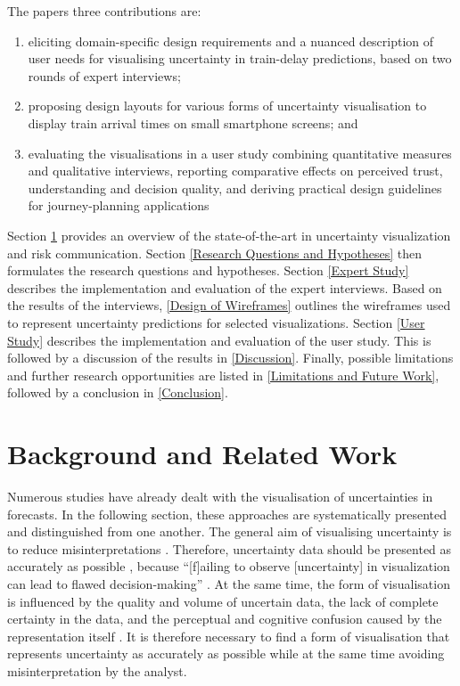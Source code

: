 \documentclass[final,journal,a4paper]{IEEEtran}
\begin{document}
\newline
\newline
The papers three contributions are: 
\begin{enumerate}
    \item eliciting domain-specific design requirements and a nuanced description of user needs for visualising uncertainty in train-delay predictions, based on two rounds of expert interviews;
    \item proposing design layouts for various forms of uncertainty visualisation to display train arrival times on small smartphone screens; and
    \item evaluating the visualisations in a user study combining quantitative measures and qualitative interviews, reporting comparative effects on perceived trust, understanding and decision quality, and deriving practical design guidelines for journey-planning applications
\end{enumerate}
Section \ref{Background and Related Work} provides an overview of the state-of-the-art in uncertainty visualization and risk communication. Section \ref{Research Questions and Hypotheses} then formulates the research questions and hypotheses. Section \ref{Expert Study} describes the implementation and evaluation of the expert interviews. Based on the results of the interviews, \ref{Design of Wireframes} outlines the wireframes used to represent uncertainty predictions for selected visualizations. Section \ref{User Study} describes the implementation and evaluation of the user study. This is followed by a discussion of the results in \ref{Discussion}. Finally, possible limitations and further research opportunities are listed in \ref{Limitations and Future Work}, followed by a conclusion in \ref{Conclusion}.

\section{Background and Related Work} \label{Background and Related Work}
Numerous studies have already dealt with the visualisation of uncertainties in forecasts. In the following section, these approaches are systematically presented and distinguished from one another. The general aim of visualising uncertainty is to reduce misinterpretations \cite{Kamal2021}. Therefore, uncertainty data should be presented as accurately as possible \cite{Kamal2021}, because ``[f]ailing to observe [uncertainty] in visualization can lead to flawed decision-making'' \cite{Kamal2021}. At the same time, the form of visualisation is influenced by the quality and volume of uncertain data, the lack of complete certainty in the data, and the perceptual and cognitive confusion caused by the representation itself \cite{Jena2020}. It is therefore necessary to find a form of visualisation that represents uncertainty as accurately as possible while at the same time avoiding misinterpretation by the analyst.
\end{document}
